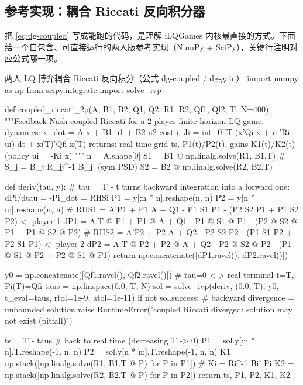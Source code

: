 \subsection{参考实现：耦合 Riccati 反向积分器}
\label{sec:dg-lq-code}
把 \cref{eq:dg-coupled} 写成能跑的代码，是理解 iLQGames 内核最直接的方式。下面给一个自包含、可直接运行的两人版参考实现（NumPy + SciPy），关键行注明对应公式哪一项。

\begin{codebox}[Python]{两人 LQ 博弈耦合 Riccati 反向积分（公式 dg-coupled / dg-gain）}
import numpy as np
from scipy.integrate import solve_ivp

def coupled_riccati_2p(A, B1, B2, Q1, Q2, R1, R2, Qf1, Qf2, T, N=400):
    """Feedback-Nash coupled Riccati for a 2-player finite-horizon LQ game.
    dynamics: x_dot = A x + B1 u1 + B2 u2
    cost  i:  Ji = int_0^T (x'Qi x + ui'Ri ui) dt + x(T)'Qfi x(T)
    returns:  real-time grid ts, P1(t)/P2(t), gains K1(t)/K2(t) (policy ui = -Ki x)
    """
    n = A.shape[0]
    S1 = B1 @ np.linalg.solve(R1, B1.T)     # S_j = B_j R_jj^{-1} B_j' (sym PSD)
    S2 = B2 @ np.linalg.solve(R2, B2.T)

    def deriv(tau, y):
        # tau = T - t turns backward integration into a forward one: dPi/dtau = -Pi_dot = RHSi
        P1 = y[:n * n].reshape(n, n)
        P2 = y[n * n:].reshape(n, n)
        # RHS1 = A'P1 + P1 A + Q1 - P1 S1 P1 - (P2 S2 P1 + P1 S2 P2)   <- player 1
        dP1 = A.T @ P1 + P1 @ A + Q1 - P1 @ S1 @ P1 - (P2 @ S2 @ P1 + P1 @ S2 @ P2)
        # RHS2 = A'P2 + P2 A + Q2 - P2 S2 P2 - (P1 S1 P2 + P2 S1 P1)   <- player 2
        dP2 = A.T @ P2 + P2 @ A + Q2 - P2 @ S2 @ P2 - (P1 @ S1 @ P2 + P2 @ S1 @ P1)
        return np.concatenate([dP1.ravel(), dP2.ravel()])

    y0 = np.concatenate([Qf1.ravel(), Qf2.ravel()])    # tau=0 <-> real terminal t=T, Pi(T)=Qfi
    taus = np.linspace(0.0, T, N)
    sol = solve_ivp(deriv, (0.0, T), y0, t_eval=taus, rtol=1e-9, atol=1e-11)
    if not sol.success:                                # backward divergence = unbounded solution
        raise RuntimeError("coupled Riccati diverged: solution may not exist (pitfall)")

    ts = T - taus                                      # back to real time (decreasing T -> 0)
    P1 = sol.y[:n * n].T.reshape(-1, n, n)
    P2 = sol.y[n * n:].T.reshape(-1, n, n)
    K1 = np.stack([np.linalg.solve(R1, B1.T @ P) for P in P1])   # Ki = Ri^{-1} Bi' Pi
    K2 = np.stack([np.linalg.solve(R2, B2.T @ P) for P in P2])
    return ts, P1, P2, K1, K2
\end{codebox}

